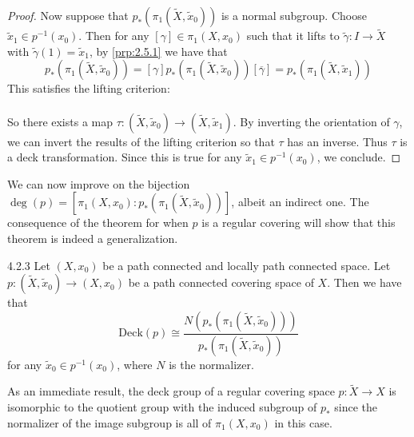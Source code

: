 \documentclass[a4paper]{article}
\begin{document}
\begin{prp}{}{}
\begin{proof}
Now suppose that $p_\ast(\pi_1(\tilde{X},\tilde{x}_0))$ is a normal subgroup. Choose $\tilde{x}_1\in p^{-1}(x_0)$. Then for any $[\gamma]\in\pi_1(X,x_0)$ such that it lifts to $\tilde{\gamma}:I\to\tilde{X}$ with $\tilde{\gamma}(1)=\tilde{x}_1$, by \ref{prp:2.5.1} we have that $$p_\ast(\pi_1(\tilde{X},\tilde{x}_0))=[\gamma]p_\ast(\pi_1(\tilde{X},\tilde{x}_0))[\overline{\gamma}]=p_\ast(\pi_1(\tilde{X},\tilde{x}_1))$$ This satisfies the lifting criterion: \\
\\
So there exists a map $\tau:(\tilde{X},\tilde{x}_0)\to(\tilde{X},\tilde{x}_1)$. By inverting the orientation of $\gamma$, we can invert the results of the lifting criterion so that $\tau$ has an inverse. Thus $\tau$ is a deck transformation. Since this is true for any $\tilde{x}_1\in p^{-1}(x_0)$, we conclude. 
\end{proof}
\end{prp}

We can now improve on the bijection $\deg(p)=[\pi_1(X,x_0):p_\ast(\pi_1(\tilde{X},\tilde{x}_0))]$, albeit an indirect one. The consequence of the theorem for when $p$ is a regular covering will show that this theorem is indeed a generalization. 

\begin{thm}{}{4.2.3} Let $(X,x_0)$ be a path connected and locally path connected space. Let $p:(\tilde{X},\tilde{x}_0)\to(X,x_0)$ be a path connected covering space of $X$. Then we have that $$\text{Deck}(p)\cong\frac{N(p_\ast(\pi_1(\tilde{X},\tilde{x}_0)))}{p_\ast(\pi_1(\tilde{X},\tilde{x}_0))}$$ for any $\tilde{x}_0\in p^{-1}(x_0)$, where $N$ is the normalizer. 
\end{thm}

As an immediate result, the deck group of a regular covering space $p:\tilde{X}\to X$ is isomorphic to the quotient group with the induced subgroup of $p_\ast$ since the normalizer of the image subgroup is all of $\pi_1(X,x_0)$ in this case. 
\end{document}
